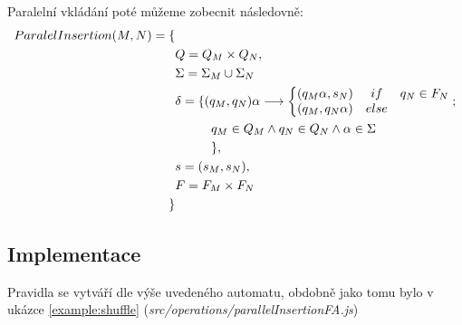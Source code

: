 Paralelní vkládání poté můžeme zobecnit následovně:
\begin{equation}
\label{eqA:ParalelInsertion}
\begin{split}
    ParalelInsertion(M,N) = \{ &\\
           &Q = Q_{M} \times Q_{N},\\
    &  \Sigma = \Sigma_{M} \cup \Sigma_{N} \\
    & \delta = \{ (q_{M},q_{N})\alpha \longrightarrow \left\{\begin{matrix}
 (q_{M}\alpha, s_{N})& if & q_N \in F_{N}\\ 
 (q_{M}, q_{N}\alpha)& else & 
\end{matrix}\right.;\\
    &\hspace*{1cm} q_{M} \in Q_{M} \land q_{N} \in Q_{N} \land \alpha \in \Sigma\\
    &\hspace*{1cm}\}, \\
    & s = (s_{M}, s_{N}), \\
    & F = F_{M} \times F_{N} \\
    \}&
\end{split}
\end{equation}



\subsection{Implementace}
Pravidla se vytváří dle výše uvedeného automatu, obdobně jako tomu bylo v ukázce \ref{example:shuffle}
(\textit{src/operations/parallelInsertionFA.js})
